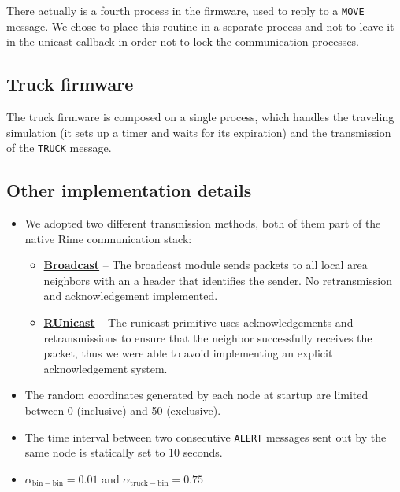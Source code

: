 \documentclass[a4paper, 11pt, parskip=half]{scrartcl}
\begin{document}
There actually is a fourth process in the firmware, used to reply to a \texttt{MOVE} message. We chose to place this routine in a separate process and not to leave it in the unicast callback in order not to lock the communication processes.

\subsection{Truck firmware}

The truck firmware is composed on a single process, which handles the traveling simulation (it sets up a timer and waits for its expiration) and the transmission of the \texttt{TRUCK} message.

\subsection{Other implementation details}

\begin{itemize}
	\item We adopted two different transmission methods, both of them part of the native Rime communication stack:
		\begin{itemize}
			\item \href{http://contiki.sourceforge.net/docs/2.6/a01720.html}{\textbf{Broadcast}} -- The broadcast module sends packets to all local area neighbors with an a header that identifies the sender. No retransmission and acknowledgement implemented.
			\item \href{http://contiki.sourceforge.net/docs/2.6/a01738.html}{\textbf{RUnicast}} -- The runicast primitive uses acknowledgements and retransmissions to ensure that the neighbor successfully receives the packet, thus we were able to avoid implementing an explicit acknowledgement system.
		\end{itemize}
	\item The random coordinates generated by each node at startup are limited between 0 (inclusive) and 50 (exclusive).
	\item The time interval between two consecutive \texttt{ALERT} messages sent out by the same node is statically set to 10 seconds.
	\item $\alpha_\mathrm{bin-bin} = 0.01$ and $\alpha_\mathrm{truck-bin} = 0.75$
\end{itemize}
\end{document}
